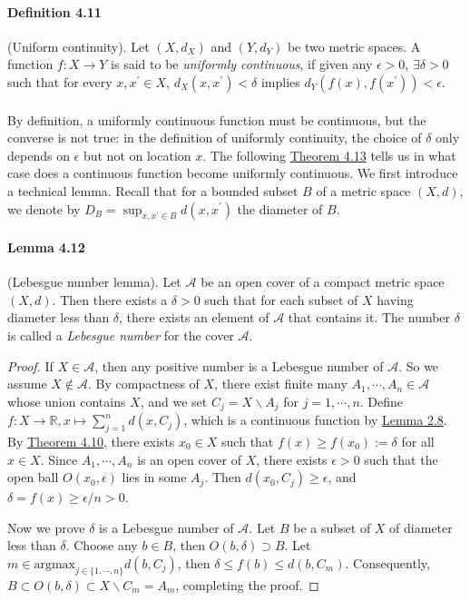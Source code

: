 \documentclass{article}
\numberwithin{equation}{section}
\theoremstyle{plain}
\theoremstyle{definition}
\begin{document}
\paragraph{Definition 4.11\label{def:4.11}} (Uniform continuity). Let $(X,d_X)$ and $(Y,d_Y)$ be two metric spaces. A function $f:X\to Y$ is said to be \textit{uniformly continuous}, if given any $\epsilon > 0$, $\exists\delta > 0$ such that for every $x,x^\prime\in X$, $d_X(x,x^\prime)<\delta$ implies $d_Y(f(x),f(x^\prime)) < \epsilon$.

\paragraph{} By definition, a uniformly continuous function must be continuous, but the converse is not true: in the definition of uniformly continuity, the choice of $\delta$ only depends on $\epsilon$ but not on location $x$. The following \hyperref[thm:4.13]{Theorem 4.13} tells us in what case does a continuous function become uniformly continuous. We first introduce a technical lemma. Recall that for a bounded subset $B$ of a metric space $(X,d)$, we denote by $D_B=\sup_{x,x^\prime\in B} d(x,x^\prime)$ the diameter of $B$.

\paragraph{Lemma 4.12\label{lemma:4.12}} (Lebesgue number lemma). Let $\mathscr{A}$ be an open cover of a compact metric space $(X,d)$. Then there exists a $\delta > 0$ such that for each subset of $X$ having diameter less than $\delta$, there exists an element of $\mathscr{A}$ that contains it. The number $\delta$ is called a \textit{Lebesgue number} for the cover $\mathscr{A}$.
\begin{proof}
If $X\in\mathscr{A}$, then any positive number is a Lebesgue number of $\mathscr{A}$. So we assume $X\notin\mathscr{A}$. By compactness of $X$, there exist finite many $A_1,\cdots,A_n\in\mathscr{A}$ whose union contains $X$, and we set $C_j = X\backslash A_j$ for $j=1,\cdots,n$. Define $f:X\to\mathbb{R},x\mapsto\sum_{j=1}^n d(x,C_j)$, which is a continuous function by \hyperref[lemma:2.8]{Lemma 2.8}. By \hyperref[thm:4.10]{Theorem 4.10}, there exists $x_0\in X$ such that $f(x)\geq f(x_0):=\delta$ for all $x\in X$. Since $A_1,\cdots,A_n$ is an open cover of $X$, there exists $\epsilon >0$ such that the open ball $O(x_0,\epsilon)$ lies in some $A_j$. Then $d(x_0,C_j)\geq\epsilon$, and $\delta=f(x)\geq \epsilon/n > 0$.

Now we prove $\delta$ is a Lebesgue number of $\mathscr{A}$. Let $B$ be a subset of $X$ of diameter less than $\delta$. Choose any $b\in B$, then $O(b,\delta)\supset B$. Let $m\in\mathrm{argmax}_{j\in\{1,\cdots,n\}}d(b,C_j)$, then $\delta\leq f(b)\leq d(b,C_m)$. Consequently, $B\subset O(b,\delta)\subset X\backslash C_m = A_m$, completing the proof.
\end{proof}
\end{document}
